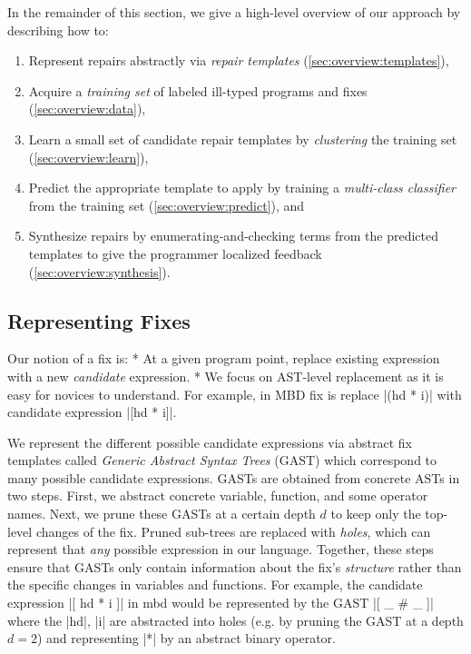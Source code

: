 In the remainder of this section, we give a high-level overview of our approach 
by describing how to:

\begin{enumerate}

  \item Represent repairs abstractly via \emph{repair templates} 
        (\autoref{sec:overview:templates}), 

  \item Acquire a \emph{training set} of labeled ill-typed programs and fixes 
        (\autoref{sec:overview:data}),

  \item Learn a small set of candidate repair templates by \emph{clustering} 
        the training set (\autoref{sec:overview:learn}),

  \item Predict the appropriate template to apply by training a \emph{multi-class classifier} 
        from the training set (\autoref{sec:overview:predict}), and  

  \item Synthesize repairs by enumerating-and-checking terms from the 
        predicted templates to give the programmer localized feedback 
        (\autoref{sec:overview:synthesis}).
\end{enumerate}

\subsection{Representing Fixes}
\label{sec:overview:templates} 

Our notion of a fix is: 
* At a given program point, replace existing expression with a new \emph{candidate} expression.  
* We focus on AST-level replacement as it is easy for novices to understand.
 For example, in MBD fix is replace |(hd * i)| with candidate expression |[hd * i]|.

%
We represent the different possible candidate expressions 
via abstract fix templates called \emph{Generic Abstract Syntax Trees} (GAST)
which correspond to many possible candidate expressions.
%
GASTs are obtained from concrete ASTs in two steps.
%
First, we abstract concrete variable, function, 
and some operator names. 
%
Next, we prune these GASTs at a certain depth $d$ 
to keep only the top-level changes of the fix. 
Pruned sub-trees are replaced with \emph{holes}, 
which can represent that \emph{any} possible 
expression in our language.
%
Together, these steps ensure that GASTs only contain 
information about the fix's \emph{structure} rather 
than the specific changes in variables and functions. 
%
 For example, the candidate expression 
|[ hd * i ]| in mbd would be represented by the GAST
|[ _ # _ ]| where the |hd|, |i| are abstracted into holes 
(e.g. by pruning the GAST at a depth $d=2$)
and representing |*| by an abstract binary operator.

